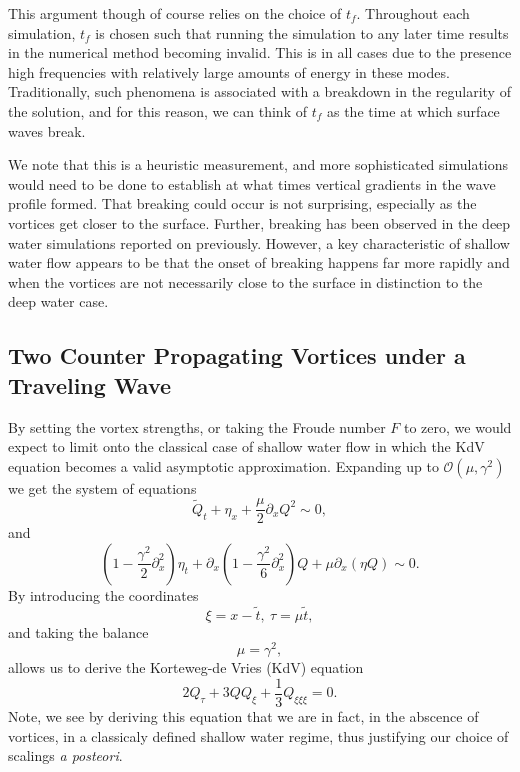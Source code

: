 \documentclass[a4paper,11pt]{article}
\newcommand{\p}{\partial}
\begin{document}
This argument though of course relies on the choice of $t_{f}$.  Throughout each simulation, $t_{f}$ is chosen such that running the simulation to any later time results in the numerical method becoming invalid.  This is in all cases due to the presence high frequencies with relatively large amounts of energy in these modes.  Traditionally, such phenomena is associated with a breakdown in the regularity of the solution, and for this reason, we can think of $t_{f}$ as the time at which surface waves break.  

We note that this is a heuristic measurement, and more sophisticated simulations would need to be done to establish at what times vertical gradients in the wave profile formed.  That breaking could occur is not surprising, especially as the vortices get closer to the surface.  Further, breaking has been observed in the deep water simulations reported on previously.  However, a key characteristic of shallow water flow appears to be that the onset of breaking happens far more rapidly and when the vortices are not necessarily close to the surface in distinction to the deep water case.     
\subsection*{Two Counter Propagating Vortices under a Traveling Wave}
By setting the vortex strengths, or taking the Froude number $F$ to zero, we would expect to limit onto the classical case of shallow water flow in which the KdV equation becomes a valid asymptotic approximation.  Expanding up to $\mathcal{O}(\mu,\gamma^{2})$ we get the system of equations 
\[
\tilde{Q}_{t} + \eta_{x} + \frac{\mu}{2}\p_{x}Q^{2} \sim 0, 
\]
and
\[
\left(1 - \frac{\gamma^{2}}{2}\p_{x}^{2}\right)\eta_{t} + \p_{x}\left(1-\frac{\gamma^{2}}{6}\p_{x}^{2} \right)Q + \mu \p_{x}(\eta Q) \sim 0.
\]
By introducing the coordinates
\[
\xi = x - \tilde{t}, ~ \tau = \mu \tilde{t}, 
\]
and taking the balance 
\[
\mu = \gamma^{2}, 
\]
allows us to derive the Korteweg-de Vries (KdV) equation
\[
2Q_{\tau} + 3QQ_{\xi} + \frac{1}{3} Q_{\xi\xi\xi} = 0.
\]
Note, we see by deriving this equation that we are in fact, in the abscence of vortices, in a classicaly defined shallow water regime, thus justifying our choice of scalings {\it a posteori}.  
\end{document}
